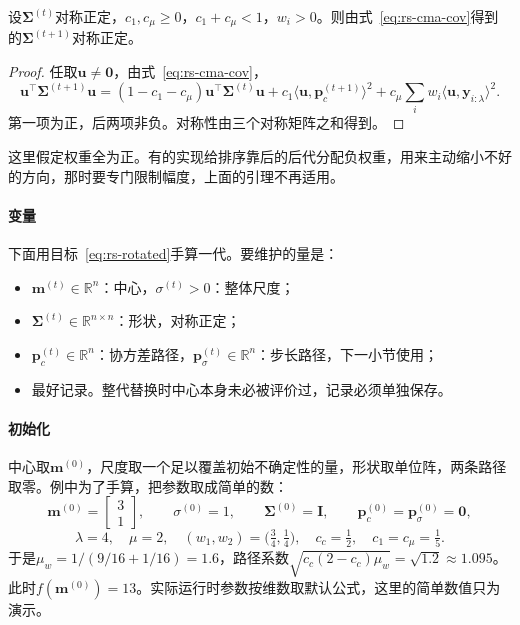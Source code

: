 \begin{lemma}[协方差更新保持正定]
\label{lem:rs-cma-pd}
设$\bm{\Sigma}^{(t)}$对称正定，$c_1,c_\mu\geq0$，$c_1+c_\mu<1$，$w_i>0$。则由式~\eqref{eq:rs-cma-cov}得到的$\bm{\Sigma}^{(t+1)}$对称正定。
\end{lemma}

\begin{proof}
任取$\bm{u}\neq\bm{0}$，由式~\eqref{eq:rs-cma-cov}，
\[
 \bm{u}^\top\bm{\Sigma}^{(t+1)}\bm{u}
 =(1-c_1-c_\mu)\bm{u}^\top\bm{\Sigma}^{(t)}\bm{u}
 +c_1\langle\bm{u},\bm{p}_c^{(t+1)}\rangle^2
 +c_\mu\sum_iw_i\langle\bm{u},\bm{y}_{i:\lambda}\rangle^2.
\]
第一项为正，后两项非负。对称性由三个对称矩阵之和得到。
\end{proof}

这里假定权重全为正。有的实现给排序靠后的后代分配负权重，用来主动缩小不好的方向，那时要专门限制幅度，上面的引理不再适用。

\paragraph{变量}
下面用目标~\eqref{eq:rs-rotated}手算一代。要维护的量是：
\begin{itemize}
 \item $\bm{m}^{(t)}\in\mathbb{R}^n$：中心，$\sigma^{(t)}>0$：整体尺度；
 \item $\bm{\Sigma}^{(t)}\in\mathbb{R}^{n\times n}$：形状，对称正定；
 \item $\bm{p}_c^{(t)}\in\mathbb{R}^n$：协方差路径，$\bm{p}_\sigma^{(t)}\in\mathbb{R}^n$：步长路径，下一小节使用；
 \item 最好记录。整代替换时中心本身未必被评价过，记录必须单独保存。
\end{itemize}

\paragraph{初始化}
中心取$\bm{m}^{(0)}$，尺度取一个足以覆盖初始不确定性的量，形状取单位阵，两条路径取零。例中为了手算，把参数取成简单的数：
\[
 \bm{m}^{(0)}=\begin{bmatrix}3\\1\end{bmatrix},\qquad\sigma^{(0)}=1,\qquad\bm{\Sigma}^{(0)}=\bm{I},\qquad\bm{p}_c^{(0)}=\bm{p}_\sigma^{(0)}=\bm{0},
\]
\[
 \lambda=4,\quad\mu=2,\quad(w_1,w_2)=\bigl(\tfrac34,\tfrac14\bigr),\quad c_c=\tfrac12,\quad c_1=c_\mu=\tfrac15.
\]
于是$\mu_w=1/(9/16+1/16)=1.6$，路径系数$\sqrt{c_c(2-c_c)\mu_w}=\sqrt{1.2}\approx1.095$。此时$f(\bm{m}^{(0)})=13$。实际运行时参数按维数取默认公式，这里的简单数值只为演示。

